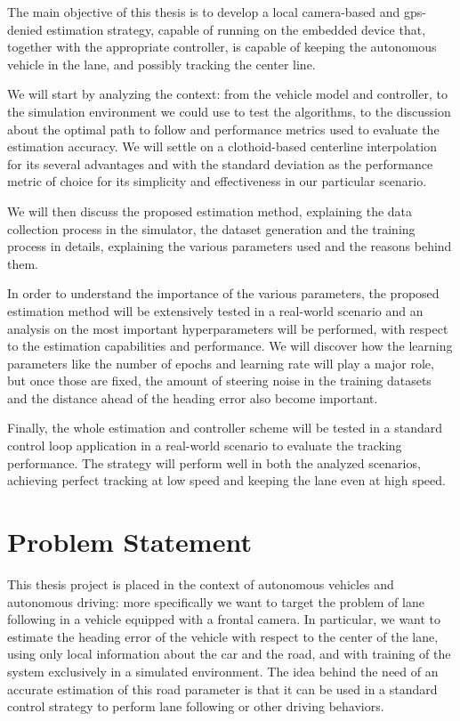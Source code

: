 \documentclass[a4paper,12pt,sort&compress]{article}
\begin{document}
    The main objective of this thesis is to develop a local camera-based and gps-denied estimation strategy, capable of running on
    the embedded device that, together with the appropriate controller, is capable
    of keeping the autonomous vehicle in the lane, and possibly tracking the center line. 

    We will start by analyzing the context: from the vehicle model and controller, to the simulation environment we
    could use to test the algorithms, to the discussion about the optimal path to follow and performance
    metrics used to evaluate the estimation accuracy. We will settle on a clothoid-based centerline
    interpolation for its several advantages and with the standard deviation as the performance
    metric of choice for its simplicity and effectiveness in our particular scenario.

    We will then discuss the proposed estimation method, explaining the data collection process in
    the simulator, the dataset generation and the training process in details, explaining the
    various parameters used and the reasons behind them. 

    In order to understand the importance of the various parameters, 
    the proposed estimation method will be extensively tested in a real-world scenario and an
    analysis on the most important hyperparameters will be performed, with respect to the estimation
    capabilities and performance. We will discover how the learning parameters like the number of
    epochs and learning rate will play a major role, but once those are fixed, the amount of
    steering noise in the training datasets and the distance ahead of the heading error also become
    important. 

    Finally, the whole estimation and controller scheme will be tested in a standard control loop
    application in a real-world scenario to evaluate the tracking performance. The strategy will perform
    well in both the analyzed scenarios, achieving perfect tracking at low speed and keeping the
    lane even at high speed.

    \newpage


\section{Problem Statement}
    This thesis project is placed in the context of autonomous vehicles and
    autonomous driving: more specifically we want to target the problem of lane
    following in a vehicle equipped with a frontal camera. In particular, we
    want to estimate the heading error of the vehicle with respect to the center
    of the lane, using only
    local information about the car and the road, and with training of the system exclusively in a simulated environment. The idea behind the need of an
    accurate estimation of this road parameter is that it can be used in a
    standard control strategy to perform lane following or other driving
    behaviors.
\end{document}
